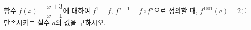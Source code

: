 \hspace*{2mm}\begin{minipage}[t]{\dimexpr\linewidth-2mm\relax}\vspace{0pt}
함수 $f(x)=\dfrac{x+3}{x-1}$에 대하여 $f^1=f$, $f^{n+1}=f\circ f^n$으로 정의할 때, $f^{1001}(a)=2$를 만족시키는 실수 $a$의 값을 구하시오. \end{minipage}
